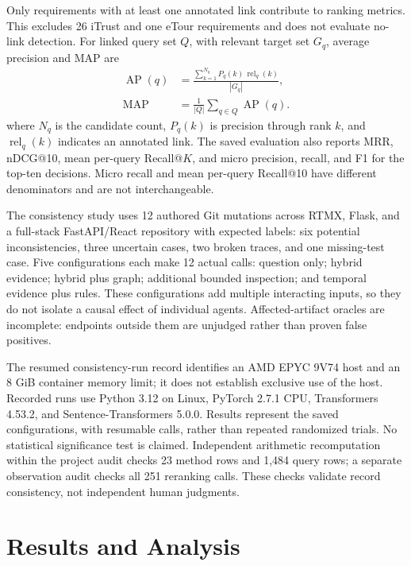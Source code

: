 \documentclass[conference,letterpaper,10pt]{IEEEtran}
\begin{document}
Only requirements with at least one annotated link contribute to ranking metrics. This excludes 26 iTrust and one eTour requirements and does not evaluate no-link detection. For linked query set $Q$, with relevant target set $G_q$, average precision and MAP are
\begin{equation}
 \begin{aligned}
 \operatorname{AP}(q)&=\frac{\sum_{k=1}^{N_q}P_q(k)\,\operatorname{rel}_q(k)}{|G_q|},\\
 \operatorname{MAP}&=\frac{1}{|Q|}\sum_{q\in Q}\operatorname{AP}(q).
 \end{aligned}
\end{equation}
where $N_q$ is the candidate count, $P_q(k)$ is precision through rank $k$, and $\operatorname{rel}_q(k)$ indicates an annotated link. The saved evaluation also reports MRR, nDCG@10, mean per-query Recall@$K$, and micro precision, recall, and F1 for the top-ten decisions. Micro recall and mean per-query Recall@10 have different denominators and are not interchangeable.

The consistency study uses 12 authored Git mutations across RTMX, Flask, and a full-stack FastAPI/React repository with expected labels: six potential inconsistencies, three uncertain cases, two broken traces, and one missing-test case. Five configurations each make 12 actual calls: question only; hybrid evidence; hybrid plus graph; additional bounded inspection; and temporal evidence plus rules. These configurations add multiple interacting inputs, so they do not isolate a causal effect of individual agents. Affected-artifact oracles are incomplete: endpoints outside them are unjudged rather than proven false positives.

The resumed consistency-run record identifies an AMD EPYC 9V74 host and an 8 GiB container memory limit; it does not establish exclusive use of the host. Recorded runs use Python 3.12 on Linux, PyTorch 2.7.1 CPU, Transformers 4.53.2, and Sentence-Transformers 5.0.0. Results represent the saved configurations, with resumable calls, rather than repeated randomized trials. No statistical significance test is claimed. Independent arithmetic recomputation within the project audit checks 23 method rows and 1,484 query rows; a separate observation audit checks all 251 reranking calls. These checks validate record consistency, not independent human judgments.

\section{Results and Analysis}
\end{document}
